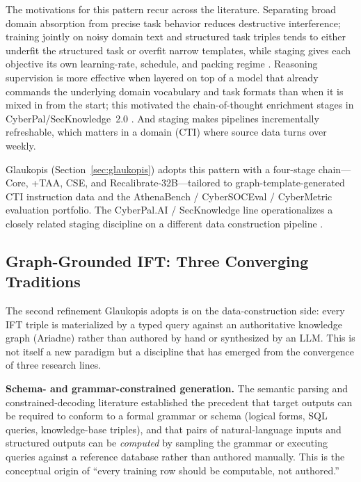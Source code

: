 \documentclass[webpdf,contemporary,large]{oup-authoring-template}
\theoremstyle{thmstyleone}
\theoremstyle{thmstyletwo}
\theoremstyle{thmstylethree}
\begin{document}
The motivations for this pattern recur across the literature. Separating broad domain absorption from precise task behavior reduces destructive interference; training jointly on noisy domain text and structured task triples tends to either underfit the structured task or overfit narrow templates, while staging gives each objective its own learning-rate, schedule, and packing regime \cite{gururangan2020dontstop,ouyang2022instructgpt}. Reasoning supervision is more effective when layered on top of a model that already commands the underlying domain vocabulary and task formats than when it is mixed in from the start; this motivated the chain-of-thought enrichment stages in CyberPal/SecKnowledge~2.0 \cite{wei2022cot,levi2025toward}. And staging makes pipelines incrementally refreshable, which matters in a domain (CTI) where source data turns over weekly.

Glaukopis (Section~\ref{sec:glaukopis}) adopts this pattern with a four-stage chain---Core, +TAA, CSE, and Recalibrate-32B---tailored to graph-template-generated CTI instruction data and the AthenaBench / CyberSOCEval / CyberMetric evaluation portfolio. The CyberPal.AI / SecKnowledge line operationalizes a closely related staging discipline on a different data construction pipeline \cite{levi2024cyberpal,levi2025toward}.

\subsection{Graph-Grounded IFT: Three Converging Traditions}
\label{sec:ift-structured}

The second refinement Glaukopis adopts is on the data-construction side: every IFT triple is materialized by a typed query against an authoritative knowledge graph (Ariadne) rather than authored by hand or synthesized by an LLM. This is not itself a new paradigm but a discipline that has emerged from the convergence of three research lines.

\textbf{Schema- and grammar-constrained generation.} The semantic parsing and constrained-decoding literature established the precedent that target outputs can be required to conform to a formal grammar or schema (logical forms, SQL queries, knowledge-base triples), and that pairs of natural-language inputs and structured outputs can be \emph{computed} by sampling the grammar or executing queries against a reference database rather than authored manually. This is the conceptual origin of ``every training row should be computable, not authored.''
\end{document}
